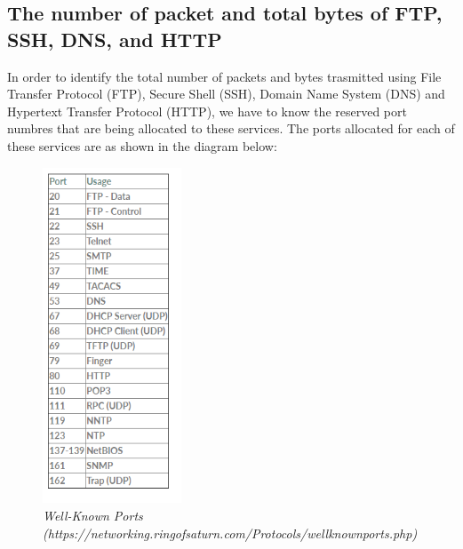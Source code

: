 \documentclass[a4paper,11pt]{article}
\begin{document}
\subsection{The number of packet and total bytes of FTP, SSH, DNS,  and HTTP}
In order to identify the total number of packets and bytes trasmitted using File Transfer Protocol (FTP), Secure Shell (SSH), Domain Name System (DNS) and Hypertext Transfer Protocol (HTTP), we have to know the reserved port numbres that are being allocated to these services. The ports allocated for each of these services are as shown in the diagram below:
\begin{figure}[h!]
\centering
	\includegraphics[height = 10cm]{ports}
	\caption{\textit{Well-Known Ports (https://networking.ringofsaturn.com/Protocols/wellknownports.php)}}
\end{figure}
\end{document}
